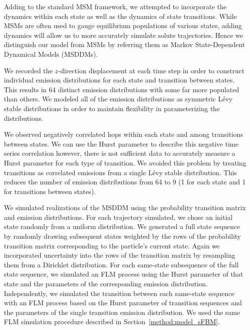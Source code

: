 \documentclass{article}
\begin{document}
  
  Adding to the standard MSM framework, we attempted to incorporate the dynamics within 
  each state as well as the dynamics of state transitions. While MSMs are often used to 
  gauge equilibrium populations of various states, adding dynamics will allow us to  %
  more accurately simulate solute trajectories. Hence we distinguish our model from 
  MSMs by referring them as Markov State-Dependent Dynamical Models (MSDDMs). 
  
  We recorded the $z$-direction displacement at each time step in order to construct 
  individual emission distributions for each state and transition between states. 
  This results in 64 distinct emission distributions with some far more populated than
  others. We modeled all of the emission distributions as symmetric L\'evy stable 
  distributions in order to maintain flexibility in parameterizing the distributions.
  
  We observed negatively correlated hops within each state and among transitions between
  states. We can use the Hurst parameter to describe this negative time series correlation
  however, there is not sufficient data to accurately measure a Hurst parameter for 
  each type of transition. We avoided this problem by treating transitions as correlated
  emissions from a single L\'evy stable distribution. This reduces the number of emission
  distributions from 64 to 9 (1 for each state and 1 for transitions between states).
  
  We simulated realizations of the MSDDM using the probability transition matrix and 
  emission distributions. For each trajectory simulated, we chose an initial state
  randomly from a uniform distribution. We generated a full state sequence by randomly
  drawing subsequent states weighted by the rows of the probability transition matrix
  corresponding to the particle's current state. Again we incorporated uncertainty into
  the rows of the transition matrix by resampling them from a Dirichlet distribution. 
  For each same-state subsequence of the full state sequence, we simulated an FLM process
  using the Hurst parameter of that state and the parameters of the corresponding emission
  distribution. Independently, we simulated the transition between each same-state 
  sequence with an FLM process based on the Hurst parameter of transition sequences and 
  the parameters of the single transition emission distribution. We used the same FLM 
  simulation procedure described in Section~\ref{method:model_sFBM}.
\end{document}
